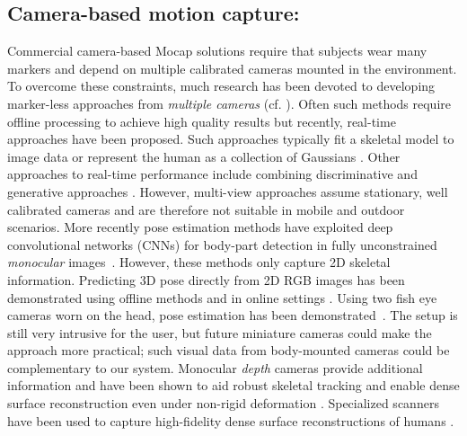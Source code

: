 \documentclass[acmtog]{acmart}
\begin{document}
\subsection{Camera-based motion capture:}
Commercial camera-based Mocap solutions require that subjects wear many markers and depend on multiple calibrated cameras mounted in the environment. To overcome these constraints, much research has been devoted to developing marker-less approaches from \emph{multiple cameras} (cf. \cite{sarafianos20163d}). Often such methods require offline processing to achieve high quality results  \cite{bregler1998tracking,ballan2012motion,starck2003model,MuVS:3DV:2017} but recently, real-time approaches \cite{rhodin2015versatile,deAguiar08,stoll2011fast,elhayek2017marconi} have been proposed. Such approaches typically fit a skeletal model to image data or represent the human as a collection of Gaussians \cite{stoll2011fast}. Other approaches to real-time performance include combining discriminative and generative approaches \cite{elhayek2017marconi,oikonomidis2012tracking}. However,  multi-view approaches  assume stationary, well calibrated cameras and are therefore not suitable in mobile and outdoor scenarios. More recently pose estimation methods have exploited deep convolutional networks (CNNs) for body-part detection in fully unconstrained \emph{monocular} images~\cite{chen2014articulated,newell2016stacked,tompson2014joint,toshev2014deeppose,wei2016cpm,cao2016realtime,he2017mask}. However, these methods only capture 2D skeletal information. Predicting 3D pose directly from 2D RGB images has been demonstrated using offline methods \cite{Bogo:ECCV:2016,tekin2016fusing,zhou2016sparseness}  and in online settings \cite{mehta2017vnect,mehta2018multiperson,omran2018NBF}. Using two fish eye cameras worn on the head, pose estimation has been demonstrated~\cite{rhodin2016egocap}. The setup is still very intrusive for the user, but future miniature cameras could make the approach more practical; such visual data from body-mounted cameras could be complementary to our system. Monocular \emph{depth} cameras provide additional information and have been shown to aid robust skeletal tracking \cite{Ganapathi2012real,taylor2012vitruvian,Pons-Moll_MRFIJCV,shotton2013real,wei2012accurate} and enable dense surface reconstruction even under non-rigid deformation \cite{zollhofer2014real,newcombe2015dynamicfusion,Dou:2016:FRP,DoubleFusion2018}. Specialized scanners have been used to capture high-fidelity dense surface reconstructions of humans \cite{pons2015dyna,collet2015high,ponsmollSIGGRAPH17clothcap}.
\end{document}
